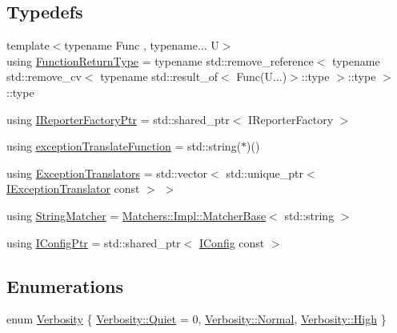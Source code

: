 \subsection*{Typedefs}
\begin{DoxyCompactItemize}
\item 
{\footnotesize template$<$typename Func , typename... U$>$ }\\using \mbox{\hyperlink{namespace_catch_a3051165b0eea6023939f0f8a71ecf03f}{Function\+Return\+Type}} = typename std\+::remove\+\_\+reference$<$ typename std\+::remove\+\_\+cv$<$ typename std\+::result\+\_\+of$<$ Func(U...)$>$\+::type $>$\+::type $>$\+::type
\item 
using \mbox{\hyperlink{namespace_catch_ad1b36ac40c2739e52fd453dcdddf0d09}{I\+Reporter\+Factory\+Ptr}} = std\+::shared\+\_\+ptr$<$ I\+Reporter\+Factory $>$
\item 
using \mbox{\hyperlink{namespace_catch_ae8d8673884dc36b98875106322a2a37b}{exception\+Translate\+Function}} = std\+::string($\ast$)()
\item 
using \mbox{\hyperlink{namespace_catch_a7ad07967e688fdc03cf784f58be4b741}{Exception\+Translators}} = std\+::vector$<$ std\+::unique\+\_\+ptr$<$ \mbox{\hyperlink{struct_catch_1_1_i_exception_translator}{I\+Exception\+Translator}} const  $>$ $>$
\item 
using \mbox{\hyperlink{namespace_catch_aba438977e831821a2eeca82b9b4f4af2}{String\+Matcher}} = \mbox{\hyperlink{struct_catch_1_1_matchers_1_1_impl_1_1_matcher_base}{Matchers\+::\+Impl\+::\+Matcher\+Base}}$<$ std\+::string $>$
\item 
using \mbox{\hyperlink{namespace_catch_afd20a5d4f9d2f4d525db81a7765367b0}{I\+Config\+Ptr}} = std\+::shared\+\_\+ptr$<$ \mbox{\hyperlink{struct_catch_1_1_i_config}{I\+Config}} const  $>$
\end{DoxyCompactItemize}
\subsection*{Enumerations}
\begin{DoxyCompactItemize}
\item 
enum \mbox{\hyperlink{namespace_catch_af85c0d46dfe687d923a157362fd07737}{Verbosity}} \{ \mbox{\hyperlink{namespace_catch_af85c0d46dfe687d923a157362fd07737a098753f8980036f4b936e3d4b6997111}{Verbosity\+::\+Quiet}} = 0, 
\mbox{\hyperlink{namespace_catch_af85c0d46dfe687d923a157362fd07737a960b44c579bc2f6818d2daaf9e4c16f0}{Verbosity\+::\+Normal}}, 
\mbox{\hyperlink{namespace_catch_af85c0d46dfe687d923a157362fd07737a655d20c1ca69519ca647684edbb2db35}{Verbosity\+::\+High}}
 \}
\end{DoxyCompactItemize}
